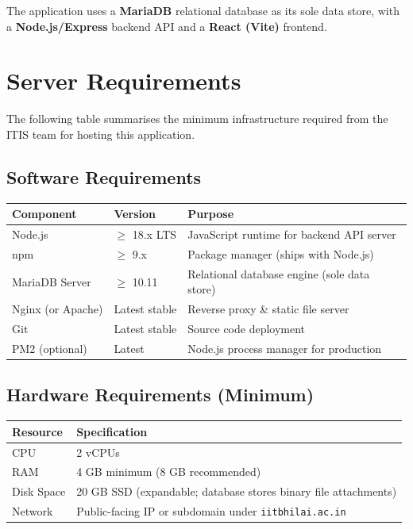 \documentclass[12pt,a4paper]{article}
\begin{document}
The application uses a \textbf{MariaDB} relational database as its sole data store, with a \textbf{Node.js/Express} backend API and a \textbf{React (Vite)} frontend.

\section{Server Requirements}

The following table summarises the minimum infrastructure required from the ITIS team for hosting this application.

\subsection{Software Requirements}

\begin{longtable}{p{4cm} p{3cm} p{7cm}}
    \toprule
    \textbf{Component} & \textbf{Version} & \textbf{Purpose} \\
    \midrule
    \endhead
    
    Node.js            & $\geq$ 18.x LTS  & JavaScript runtime for backend API server \\
    npm                & $\geq$ 9.x        & Package manager (ships with Node.js) \\
    MariaDB Server     & $\geq$ 10.11      & Relational database engine (sole data store) \\
    Nginx (or Apache)  & Latest stable     & Reverse proxy \& static file server \\
    Git                & Latest stable     & Source code deployment \\
    PM2 (optional)     & Latest            & Node.js process manager for production \\
    
    \bottomrule
\end{longtable}

\subsection{Hardware Requirements (Minimum)}

\begin{longtable}{p{4cm} p{10cm}}
    \toprule
    \textbf{Resource} & \textbf{Specification} \\
    \midrule
    \endhead
    
    CPU         & 2 vCPUs \\
    RAM         & 4 GB minimum (8 GB recommended) \\
    Disk Space  & 20 GB SSD (expandable; database stores binary file attachments) \\
    Network     & Public-facing IP or subdomain under \texttt{iitbhilai.ac.in} \\
    
    \bottomrule
\end{longtable}
\end{document}
